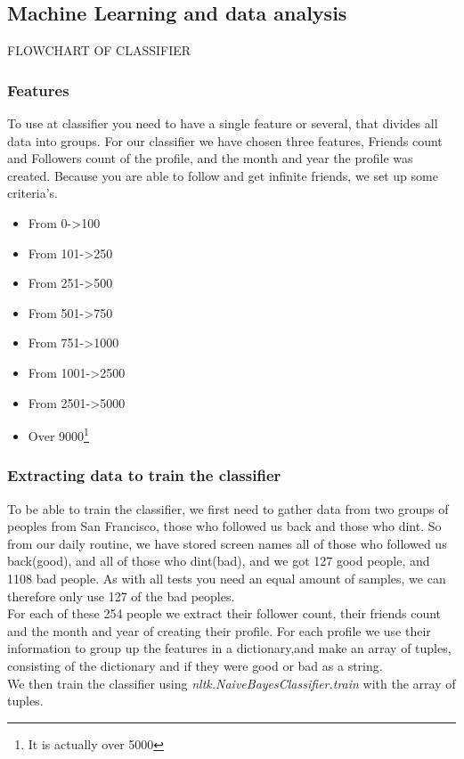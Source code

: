 \subsection{Machine Learning and data analysis}

FLOWCHART OF CLASSIFIER
\subsubsection{Features}
To use at classifier you need to have a single feature or several, that divides all data into groups. For our classifier we have chosen three features, Friends count and Followers count of the profile, and the month and year the profile was created. Because you are able to follow and get infinite friends, we set up some criteria's.\\
\begin{itemize}
	\item{From 0->100}
	\item{From 101->250}
	\item{From 251->500}
	\item{From 501->750}
	\item{From 751->1000}
	\item{From 1001->2500}
	\item{From 2501->5000}
	\item{Over 9000\footnote{It is actually over 5000}}
\end{itemize}
\subsubsection{Extracting data to train the classifier}
To be able to train the classifier, we first need to gather data from two groups of peoples from San Francisco, those who followed us back and those who dint. So from our daily routine, we have stored screen names all of those who followed us back(good), and all of those who dint(bad), and we got 127 good people, and 1108 bad people. As with all tests you need an equal amount of samples, we can therefore only use 127 of the bad peoples.\\
For each of these 254 people we extract their follower count, their friends count and the month and year of creating their profile. For each profile we use their information to group up the features in a dictionary,and make an array of tuples, consisting of the dictionary and if they were good or bad as a string.\\
We then train the classifier using \textit{nltk.NaiveBayesClassifier.train} with the array of tuples.

